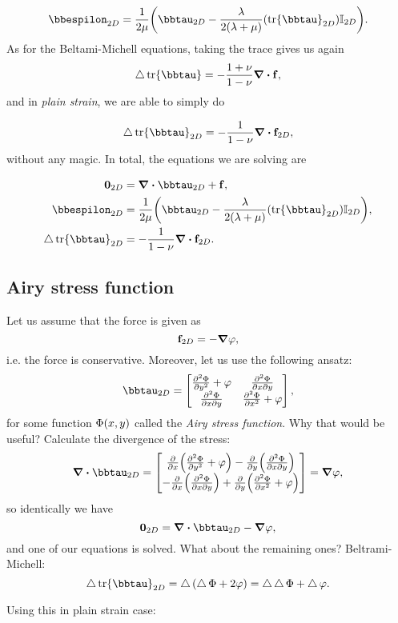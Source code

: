\documentclass[../main.tex]{subfiles}
\begin{document}
\[
	\bbespilon_{2D} = \frac{1}{2 \mu}\qty(\bbtau_{2D}-\frac{\lambda}{2\qty(\lambda+\mu)}\qty(\tr \bbtau_{2D})\identity_{2D}).
\]
As for the Beltami-Michell equations, taking the trace gives us again
\[
	\laplace \tr \bbtau = - \frac{1+\nu}{1-\nu}\divergence{\vb{f}},
\]
and in \textit{plain strain}, we are able to simply do

\[
	\laplace \tr \bbtau_{2D} = - \frac{1}{1-\nu}\divergence{\vb{f}_{2D}},
\]
without any magic. In total, the equations we are solving are

\begin{align}
  \label{eq:plain_strain_formulation}
  \vb{0}_{2D} &= \divergence{\bbtau_{2D}}+ \vb{f}, \\
  \bbespilon_{2D} &= \frac{1}{2 \mu}\qty(\bbtau_{2D}-\frac{\lambda}{2\qty(\lambda+\mu)}\qty(\tr \bbtau_{2D})\identity_{2D}),\\
  \laplace \tr \bbtau_{2D} &= - \frac{1}{1-\nu}\divergence{\vb{f}_{2D}}.
\end{align}

\subsection{Airy stress function}
\label{sec:airy_stress_function}

Let us assume that the force is given as
\[
	\vb{f}_{2D} = - \grad \varphi,
\]
i.e. the force is conservative. Moreover, let us use the following ansatz:
\[
	\bbtau_{2D}= \begin{bmatrix}
		\pdv[2]{\Phi}{y} + \varphi & \pdv[2]{\Phi}{x}{y} \\
		\pdv[2]{\Phi}{x}{y} & \pdv[2]{\Phi}{x} + \varphi
	\end{bmatrix},
\]
for some function $\Phi\qty(x,y)$ called the \textit{Airy stress function}. Why that would be useful? Calculate the divergence of the stress:
\[
	\divergence{\bbtau_{2D}} = \begin{bmatrix}
		\pdv{x}\qty(\pdv[2]{\Phi}{y}+\varphi) - \pdv{y}\qty(\pdv[2]{\Phi}{x}{y}) \\
		-\pdv{x}\qty(\pdv[2]{\Phi}{x}{y}) + \pdv{y}\qty(\pdv[2]{\Phi}{x}+\varphi)
	\end{bmatrix}
	= \grad \varphi,
\]
so identically we have
\[
	\vb{0}_{2D} = \divergence{\bbtau_{2D}} - \grad \varphi,
\]
and one of our equations is solved. What about the remaining ones? Beltrami-Michell:
\[
	\laplace \tr \bbtau_{2D} = \laplace\qty(\laplace \Phi+2 \varphi) = \laplace \laplace \Phi + \laplace \varphi.
\]

Using this in plain strain case:
\end{document}
